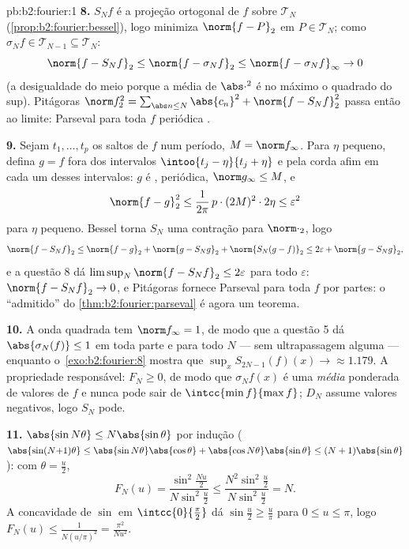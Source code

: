 \begin{solution}{pb:b2:fourier:1}
\textbf{8.} $S_Nf$ é a projeção ortogonal de $f$ sobre
$\mathcal T_N$ (\cref{prop:b2:fourier:bessel}), logo minimiza
$\norm{f - P}_2$ em $P \in \mathcal T_N$; como $\sigma_Nf
\in \mathcal T_{N-1} \subseteq \mathcal T_N$:
\[
\norm{f - S_Nf}_2 \leq \norm{f - \sigma_Nf}_2
\leq \norm{f - \sigma_Nf}_\infty \to 0
\]
(a desigualdade do meio porque a média de $\abs\cdot^2$ é no
máximo o quadrado do sup). Pitágoras $\norm f_2^2 = \sum_{\abs
n\leq N}\abs{c_n}^2 + \norm{f - S_Nf}_2^2$ passa então ao
limite: Parseval para toda $f$ periódica .

\textbf{9.} Sejam $t_1, \dots, t_p$ os saltos de $f$ num
período, $M = \norm f_\infty$. Para $\eta$ pequeno, defina $g = f$
fora dos intervalos $\intoo{t_j - \eta}{t_j + \eta}$ e pela
corda afim em cada um desses intervalos: $g$ é ,
periódica, $\norm g_\infty \leq M$, e
\[
\norm{f - g}_2^2 \leq \frac{1}{2\pi}\,p\cdot(2M)^2\cdot2\eta
\leq \varepsilon^2
\]
para $\eta$ pequeno. Bessel torna $S_N$ uma contração para
$\norm\cdot_2$, logo
\[
\norm{f - S_Nf}_2
\leq \norm{f - g}_2 + \norm{g - S_Ng}_2 + \norm{S_N(g -
f)}_2
\leq 2\varepsilon + \norm{g - S_Ng}_2 ,
\]
e a questão 8 dá $\limsup_N\norm{f - S_Nf}_2 \leq
2\varepsilon$ para todo $\varepsilon$: $\norm{f - S_Nf}_2 \to
0$, e Pitágoras fornece Parseval para toda $f$
 por partes: o ``admitido'' do
\cref{thm:b2:fourier:parseval} é agora um teorema.

\textbf{10.} A onda quadrada tem $\norm f_\infty = 1$, de modo que
a questão 5 dá $\abs{\sigma_N(f)} \leq 1$ em toda parte e para
todo $N$ --- sem ultrapassagem alguma --- enquanto
o~\cref{exo:b2:fourier:8} mostra que $\sup_xS_{2N-1}(f)(x) \to
\approx 1.179$. A propriedade responsável: $F_N \geq 0$, de modo que
$\sigma_Nf(x)$ é uma \emph{média} ponderada de valores de $f$
e nunca pode sair de $\intcc{\min f}{\max f}$; $D_N$ assume
valores negativos, logo $S_N$ pode.

\textbf{11.} $\abs{\sin N\theta} \leq N\abs{\sin\theta}$ por
indução ($\abs{\sin(N{+}1)\theta} \leq
\abs{\sin N\theta}\abs{\cos\theta} +
\abs{\cos N\theta}\abs{\sin\theta} \leq
(N+1)\abs{\sin\theta}$): com $\theta = \frac u2$,
\[
F_N(u) = \frac{\sin^2\frac{Nu}2}{N\sin^2\frac u2}
\leq \frac{N^2\sin^2\frac u2}{N\sin^2\frac u2} = N .
\]
A concavidade de $\sin$ em $\intcc{0}{\frac\pi2}$ dá
$\sin\frac u2 \geq \frac{u}{\pi}$ para $0 \leq u \leq \pi$, logo
$F_N(u) \leq \frac{1}{N(u/\pi)^2} = \frac{\pi^2}{Nu^2}$.


\end{solution}
